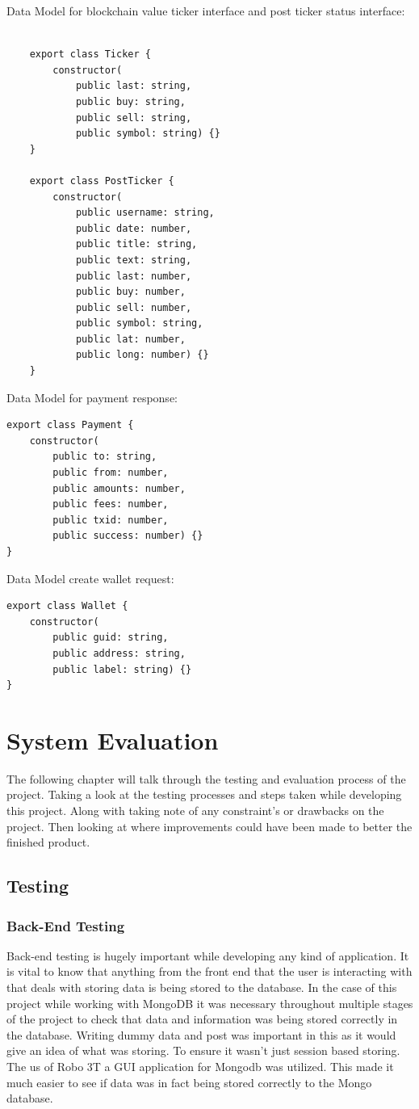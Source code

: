 Data Model for blockchain value ticker interface and post ticker status interface:
\begin{lstlisting}
       
    export class Ticker {
        constructor(
            public last: string,
            public buy: string,
            public sell: string,
            public symbol: string) {}
    }
    
    export class PostTicker {
        constructor(
            public username: string,
            public date: number,
            public title: string,
            public text: string,
            public last: number,
            public buy: number,
            public sell: number,
            public symbol: string,
            public lat: number,
            public long: number) {}
    }
\end{lstlisting}

Data Model for payment response:
\begin{lstlisting}
export class Payment {
    constructor(
        public to: string,
        public from: number,
        public amounts: number,
        public fees: number,
        public txid: number,
        public success: number) {}
}
\end{lstlisting}

Data Model create wallet request:
\begin{lstlisting}
export class Wallet {
    constructor(
        public guid: string,
        public address: string,
        public label: string) {}
}
\end{lstlisting}

\chapter{System Evaluation}

The following chapter will talk through the testing and evaluation process of the project. Taking a look at the testing processes and steps taken while developing this project. Along with taking note of any constraint's or drawbacks on the project. Then looking at where improvements could have been made to better the finished product. 
\section{Testing}
\subsection{Back-End Testing}
Back-end testing is hugely important while developing any kind of application. It is vital to know that anything from the front end that the user is interacting with that deals with storing data is being stored to the database. In the case of this project while working with MongoDB it was necessary throughout multiple stages of the project to check that data and information was being stored correctly in the database. Writing dummy data and post was important in this as it would give an idea of what was storing. To ensure it wasn't just session based storing. The us of Robo 3T a GUI application for Mongodb was utilized. This made it much easier to see if data was in fact being stored correctly to the Mongo database.

